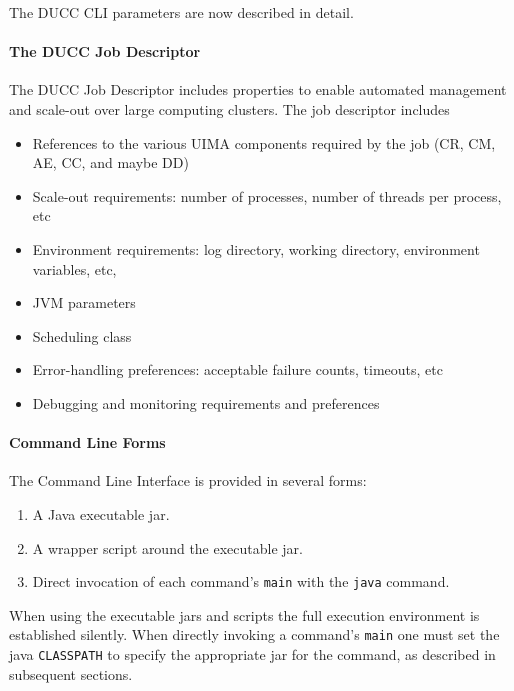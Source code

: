     The DUCC CLI parameters are now described in detail.

    \paragraph{The DUCC Job Descriptor}
    The DUCC Job Descriptor includes properties to enable automated management and scale-out 
    over large computing clusters.  The job descriptor includes
    \begin{itemize}
      \item References to the various UIMA components required by the job (CR, CM, AE, CC, and maybe DD)
      \item Scale-out requirements: number of processes, number of threads per process, etc
      \item Environment requirements: log directory, working directory, environment variables, etc,
      \item JVM parameters
      \item Scheduling class
      \item Error-handling preferences: acceptable failure counts, timeouts, etc
      \item Debugging and monitoring requirements and preferences
    \end{itemize}
  

    \paragraph{Command  Line Forms}
    The Command Line Interface is provided in several forms:

    \begin{enumerate}
      \item A Java executable jar.
      \item A wrapper script around the executable jar.
      \item Direct invocation of each command's {\tt main} with the {\tt java} command.
    \end{enumerate}

    When using the executable jars and scripts the full execution environment is established
    silently.  When directly invoking a command's {\tt main} one must set the java {\tt CLASSPATH} to
    specify the appropriate jar for the command, as described in subsequent sections.

